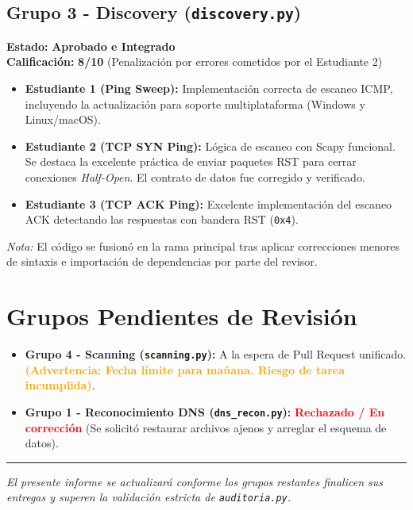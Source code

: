 \documentclass[12pt,a4paper]{article}
\begin{document}
\subsection*{Grupo 3 - Discovery (\texttt{discovery.py})}
\textbf{Estado:} \textcolor{green!70!black}{\textbf{Aprobado e Integrado}} \\
\textbf{Calificación:} \textbf{8/10} (Penalización por errores cometidos por el Estudiante 2)
\begin{itemize}[label=$\bullet$]
    \item \textbf{Estudiante 1 (Ping Sweep):} Implementación correcta de escaneo ICMP, incluyendo la actualización para soporte multiplataforma (Windows y Linux/macOS).
    \item \textbf{Estudiante 2 (TCP SYN Ping):} Lógica de escaneo con Scapy funcional. Se destaca la excelente práctica de enviar paquetes RST para cerrar conexiones \textit{Half-Open}. El contrato de datos fue corregido y verificado.
    \item \textbf{Estudiante 3 (TCP ACK Ping):} Excelente implementación del escaneo ACK detectando las respuestas con bandera RST (\texttt{0x4}).
\end{itemize}
\textit{Nota:} El código se fusionó en la rama principal tras aplicar correcciones menores de sintaxis e importación de dependencias por parte del revisor.

\section*{Grupos Pendientes de Revisión}
\begin{itemize}[label=$\bullet$]
    \item \textbf{Grupo 4 - Scanning (\texttt{scanning.py}):} A la espera de Pull Request unificado. \textcolor{orange}{\textbf{(Advertencia: Fecha límite para mañana. Riesgo de tarea incumplida)}}.
    \item \textbf{Grupo 1 - Reconocimiento DNS (\texttt{dns\_recon.py}):} \textcolor{red}{\textbf{Rechazado / En corrección}} (Se solicitó restaurar archivos ajenos y arreglar el esquema de datos).
\end{itemize}

\vspace{1cm}
\hrule
\vspace{0.5cm}
\noindent \textit{El presente informe se actualizará conforme los grupos restantes finalicen sus entregas y superen la validación estricta de \texttt{auditoria.py}.}
\end{document}
